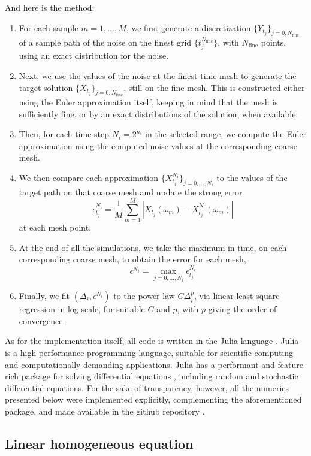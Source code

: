 \documentclass[reqno,12pt]{amsart}
\theoremstyle{plain}%
\theoremstyle{definition}
\begin{document}
And here is the method:
\begin{enumerate}
    \item For each sample $m=1, \ldots, M$, we first generate a discretization $\{Y_{t_j}\}_{j=0, N_{\mathrm{fine}}}$ of a sample path of the noise on the finest grid $\{t_j^{N_{\mathrm{fine}}}\}$, with $N_{\mathrm{fine}}$ points, using an exact distribution for the noise.
    \item Next, we use the values of the noise at the finest time mesh to generate the target solution $\{X_{t_j}\}_{j=0, N_{\mathrm{fine}}}$, still on the fine mesh. This is constructed either using the Euler approximation itself, keeping in mind that the mesh is sufficiently fine, or by an exact distributions of the solution, when available.
    \item Then, for each time step $N_i = 2^{n_i}$ in the selected range, we compute the Euler approximation using the computed noise values at the corresponding coarse mesh.
    \item We then compare each approximation $\{X_{t_j}^{N_i}\}_{j=0, \ldots, N_i}$ to the values of the target path on that coarse mesh and update the strong error
\[
    \epsilon_{t_j}^{N_i} = \frac{1}{M}\sum_{m=1}^M \left|X_{t_j}(\omega_m) - X_{t_j}^{N_i}(\omega_m)\right|
\]
at each mesh point.
    \item At the end of all the simulations, we take the maximum in time, on each corresponding coarse mesh, to obtain the error for each mesh,
\[
    \epsilon^{N_i} = \max_{j=0, \ldots, N_i} \epsilon_{t_j}^{N_i}
\]
    \item Finally, we fit $(\Delta_i, \epsilon^{N_i})$ to the power law $C\Delta_i^p$, via linear least-square regression in log scale, for suitable $C$ and $p$, with $p$ giving the order of convergence.
\end{enumerate}

As for the implementation itself, all code is written in the Julia language \cite{Julia2017}. Julia is a high-performance programming language, suitable for scientific computing and computationally-demanding applications. Julia has a performant and feature-rich package for solving differential equations \cite{RackauckasNie2017}, including random and stochastic differential equations. For the sake of transparency, however, all the numerics presented below were implemented explicitly, complementing the aforementioned package, and made available in the github repository \cite{RODEConvEM2023}.

\subsection{Linear homogeneous equation}
\label{seclinearhomogeneousrode}
\end{document}
